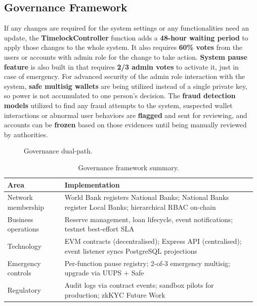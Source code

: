 \subsection{Governance Framework}
\label{sec:governance-framework}
\label{sec:governance-dual-path}
\label{sec:regulatory-compliance}

If any changes are required for the system settings or any functionalities need an update, the \textbf{TimelockController} function adds a \textbf{48-hour waiting period} to apply those changes to the whole system. It also requires \textbf{60\% votes} from the users or accounts with admin role for the change to take action. \textbf{System pause feature} is also built in that requires \textbf{2/3 admin votes} to activate it, just in case of emergency. For advanced security of the admin role interaction with the system, \textbf{safe multisig wallets} are being utilized instead of a single private key, so power is not accumulated to one person's decision. The \textbf{fraud detection models} utilized to find any fraud attempts to the system, suspected wallet interactions or abnormal user behaviors are \textbf{flagged} and sent for reviewing, and accounts can be \textbf{frozen} based on those evidences until being manually reviewed by authorities.

\begin{figure}[H]
\centering
{}
\caption[Governance dual-path]{Governance dual-path.}
\label{fig:governance-dual-path}
\end{figure}

\begin{table}[H]
\centering
\caption[Governance framework summary]{Governance framework summary.}
\label{tab:governance-summary}
\small
\begin{tabular}{@{}p{2.8cm}p{11.5cm}@{}}
\toprule
\tableheadcolor
\textbf{Area} & \textbf{Implementation} \\
\midrule
Network membership & World Bank registers National Banks; National Banks register Local Banks; hierarchical RBAC on-chain \\
Business operations & Reserve management, loan lifecycle, event notifications; testnet best-effort SLA \\
Technology & EVM contracts (decentralised); Express API (centralised); event listener syncs PostgreSQL projections \\
Emergency controls & Per-function pause registry; 2-of-3 emergency multisig; upgrade via UUPS + Safe \\
Regulatory & Audit logs via contract events; sandbox pilots for production; zkKYC Future Work \\
\bottomrule
\end{tabular}
\end{table}

